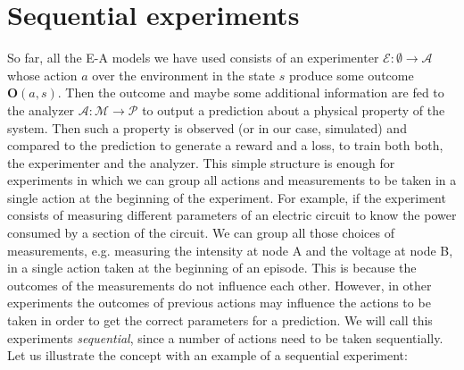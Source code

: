 \documentclass[11pt,a4paper,twoside]{report}
\newcommand{\+}{\textnormal{+} }
\theoremstyle{definition}
\numberwithin{equation}{chapter}
\begin{document}
\section{Sequential experiments}

So far, all the E-A models we have used consists of an experimenter $\mathscr{E}:\emptyset
\rightarrow \mathcal{A}$ whose action $a$ over the environment in the state $s$
produce some outcome $\textbf{O}(a,s)$. Then the outcome and maybe some
additional information are fed to the analyzer $\mathscr{A}:\mathcal{M} \rightarrow
\mathcal{P}$ to output a prediction about a physical property of the system.
Then such a property is observed (or in our case, simulated) and compared to the
prediction to generate a reward and a loss, to train both both, the experimenter
and the analyzer. This simple structure is enough for experiments in which we
can group all actions and measurements to be taken in a single action at the
beginning of the experiment. For example, if the experiment consists of
measuring different parameters of an electric circuit to know the power consumed
by a section of the circuit. We can group all those choices of measurements,
e.g. measuring the intensity at node A and the voltage at node B, in a single
action taken at the beginning of an episode. This is because the outcomes of the
measurements do not influence each other. However, in other experiments the
outcomes of previous actions may influence the actions to be taken in order to
get the correct parameters for a prediction. We will call this experiments
\textit{sequential}, since a number of actions need to be taken sequentially.
Let us illustrate the concept with an example of a sequential experiment:
\end{document}

